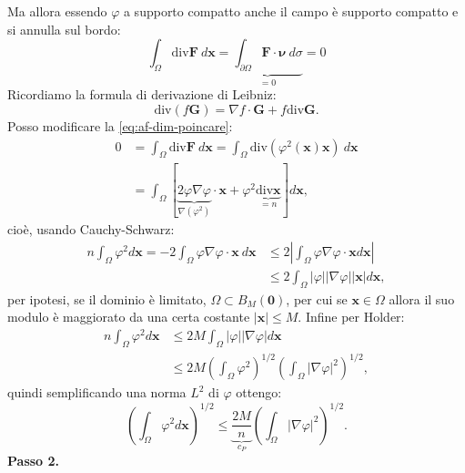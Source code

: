 \documentclass[10pt,a4paper,twoside,openright]{book}
\begin{document}
\begin{dimostrazione}
	Ma allora essendo $\displaystyle \varphi $ a supporto compatto anche il campo è supporto compatto e si annulla sul bordo:
	\begin{equation}
		\int _{\Omega }\mathrm{div}\mathbf{F} \ d\mathbf{x} =\underbrace{\int _{\partial \Omega }\mathbf{F} \cdotp \bm{\nu }\ d\sigma }_{=0} =0
		\label{eq:af-dim-poincare}
	\end{equation}
	Ricordiamo la formula di derivazione di Leibniz:
	\begin{equation*}
		\mathrm{div}( f\mathbf{G}) =\nabla f\cdotp \mathbf{G} +f\mathrm{div}\mathbf{G} .
	\end{equation*}
	Posso modificare la \eqref{eq:af-dim-poincare}:
	\begin{align*}
		0 & =\int _{\Omega }\mathrm{div}\mathbf{F} \ d\mathbf{x} =\int _{\Omega }\mathrm{div}\left( \varphi ^{2}(\mathbf{x})\mathbf{x}\right) \ d\mathbf{x}                                              \\
		  & =\int _{\Omega }\left[\underbrace{2\varphi \nabla \varphi }_{\nabla \left( \varphi ^{2}\right)} \cdotp \mathbf{x} +\varphi ^{2}\underbrace{\mathrm{div}\mathbf{x}}_{=n}\right] d\mathbf{x} , 
	\end{align*}
	cioè, usando Cauchy-Schwarz:
	\begin{align*}
		n\int _{\Omega } \varphi ^{2} d\mathbf{x} =-2\int _{\Omega } \varphi \nabla \varphi \cdotp \mathbf{x} \ d\mathbf{x} & \leqslant 2\left| \int _{\Omega } \varphi \nabla \varphi \cdotp \mathbf{x} d\mathbf{x}\right| \\
		                                                                                                                    & \leqslant 2\int _{\Omega }| \varphi | | \nabla \varphi | | \mathbf{x}| d\mathbf{x} ,          
	\end{align*}
	per ipotesi, se il dominio è limitato, $\displaystyle \Omega \subset B_{M}(\mathbf{0})$, per cui se $\displaystyle \mathbf{x} \in \Omega $ allora il suo modulo è maggiorato da una certa costante $\displaystyle | \mathbf{x}| \leqslant M$. Infine per Holder:
	\begin{align*}
		n\int _{\Omega } \varphi ^{2} d\mathbf{x} & \leqslant 2M\int _{\Omega }| \varphi | | \nabla \varphi | d\mathbf{x}                                                  \\
		                                          & \leqslant 2M\left(\int _{\Omega } \varphi ^{2}\right)^{1/2}\left(\int _{\Omega }| \nabla \varphi | ^{2}\right)^{1/2} , 
	\end{align*}
	quindi semplificando una norma $\displaystyle L^{2}$ di $\displaystyle \varphi $ ottengo:
	\begin{equation*}
		\left(\int _{\Omega } \varphi ^{2} d\mathbf{x}\right)^{1/2} \leqslant \underbrace{\frac{2M}{n}}_{c_{P}}\left(\int _{\Omega }| \nabla \varphi | ^{2}\right)^{1/2} .
	\end{equation*}
	\textbf{Passo 2.}
	

\end{dimostrazione}
\end{document}
